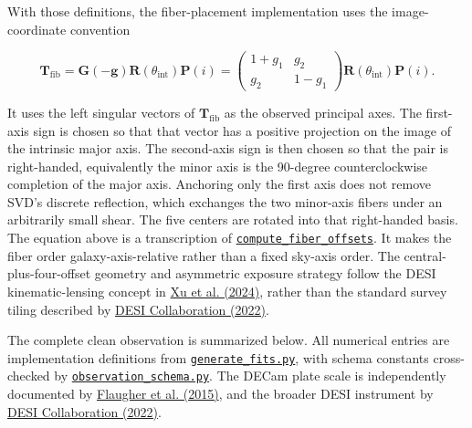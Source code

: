\documentclass[11pt]{article}
\newcommand{\code}[1]{\nolinkurl{#1}}
\begin{document}
With those definitions, the fiber-placement implementation uses the
image-coordinate convention

\[
\mathbf T_\mathrm{fib}
=\mathbf G(-\bm g)\mathbf R(\theta_\mathrm{int})\mathbf P(i)
=\begin{pmatrix}1+g_1&g_2\\g_2&1-g_1\end{pmatrix}
\mathbf R(\theta_\mathrm{int})\mathbf P(i).
\]

It uses the left singular vectors of \(\mathbf T_\mathrm{fib}\) as the observed principal
axes. The first-axis sign is chosen so that that vector has a positive projection
on the image of the intrinsic major axis. The second-axis sign is then chosen so
that the pair is right-handed, equivalently the minor axis is the 90-degree
counterclockwise completion of the major axis. Anchoring only the first axis
does not remove SVD's discrete reflection, which exchanges the two minor-axis
fibers under an arbitrarily small shear. The five centers are rotated into that
right-handed basis. The equation above is a transcription of
\href{../data_generate/observation_schema.py}{\code{compute_fiber_offsets}}. It makes the
fiber order galaxy-axis-relative rather than a fixed sky-axis order. The
central-plus-four-offset geometry and asymmetric exposure strategy follow the
DESI kinematic-lensing concept in \hyperlink{ref:xu2024}{Xu et al. (2024)}, rather than the
standard survey tiling described by \hyperlink{ref:desi2022}{DESI Collaboration (2022)}.

The complete clean observation is summarized below. All numerical entries are
implementation definitions from
\href{../data_generate/generate_fits.py}{\code{generate_fits.py}}, with schema constants
cross-checked by \href{../data_generate/observation_schema.py}{\code{observation_schema.py}}.
The DECam plate scale is independently documented by \hyperlink{ref:flaugher2015}{Flaugher et al. (2015)}, and the broader DESI instrument by \hyperlink{ref:desi2022}{DESI Collaboration (2022)}.
\end{document}
